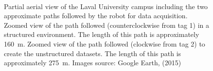 \begin{figure}[H]
    \centering
    \\ \vspace{3mm}
     \hspace{2mm}
    \caption[Partial aerial view of the Laval University campus including the two approximate paths followed by the robot for data acquisition.]{\protect{} Partial aerial view of the Laval University campus including the two approximate paths followed by the robot for data acquisition. \protect{} Zoomed view of the path followed (counterclockwise from tag 1) in a structured environment. The length of this path is approximately \SI{160}{\meter}. \protect{} Zoomed view of the path followed (clockwise from tag 2) to create the unstructured datasets. The length of this path is approximately \SI{275}{\meter}. Images source: Google Earth, (2015)}
    \label{fig:chap_slam_path}
\end{figure}

